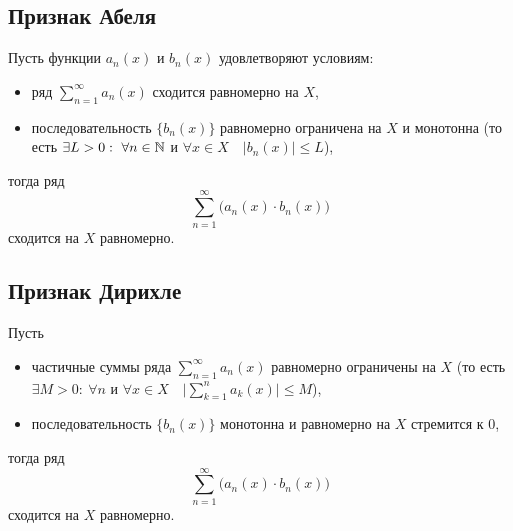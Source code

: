 \subsection{Признак Абеля}

\begin{theorem}\label{theorem:6.9.1}
    Пусть функции $a_n(x)$ и $b_n(x)$ удовлетворяют условиям:
    \begin{itemize}
        \item ряд $\sum_{n=1}^{\infty}a_n(x)$ сходится равномерно на $X$,
        \item последовательность $\big\{b_n(x)\big\}$ равномерно ограничена на $X$ и монотонна (то есть $\exists L > 0: \ \forall n \in \N$ и $\forall x \in X \quad \big|b_n(x)\big| \leqslant L$),
    \end{itemize}
    тогда ряд
    \[
        \sum_{n=1}^{\infty}\big(a_n(x) \cdot b_n(x)\big)
    \]
    сходится на $X$ равномерно.

\end{theorem}

\newpage

\subsection{Признак Дирихле}

\begin{theorem}
    Пусть
    \begin{itemize}
        \item частичные суммы ряда $\sum_{n=1}^{\infty}a_n(x)$ равномерно ограничены на $X$ (то есть $\exists M > 0: \ \forall n$ и $\forall x \in X \quad \big|\sum_{k=1}^{n}a_k(x)\big| \leqslant M$),
        \item последовательность $ \big\{b_n(x)\big\} $ монотонна и равномерно на $ X $ стремится к $ 0 $,
    \end{itemize}
    тогда ряд
    \[
        \sum_{n=1}^{\infty}\big(a_n(x) \cdot b_n(x)\big)
    \]
    сходится на $X$ равномерно.
\end{theorem}